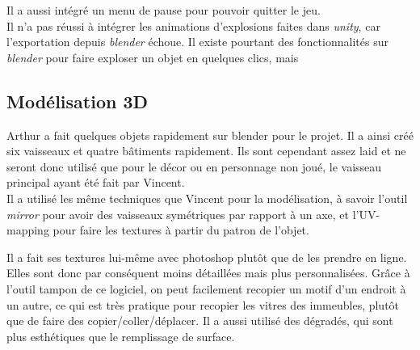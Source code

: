 \documentclass[10pt, titlepage]{report}
\begin{document}
Il a aussi intégré un menu de pause pour pouvoir quitter le jeu.\\

Il n'a pas réussi à intégrer les animations d'explosions faites dans \textit{unity}, car l'exportation depuis \textit{blender} échoue. Il existe pourtant des fonctionnalités sur \textit{blender} pour faire exploser un objet en quelques clics, mais

\subsection{Modélisation 3D}
Arthur a fait quelques objets rapidement sur blender pour le projet. Il a ainsi créé six vaisseaux et quatre bâtiments rapidement. Ils sont cependant assez laid et ne seront donc utilisé que pour le décor ou en personnage non joué, le vaisseau principal ayant été fait par Vincent.\\

Il a utilisé les même techniques que Vincent pour la modélisation, à savoir l'outil \textit{mirror} pour avoir des vaisseaux symétriques par rapport à un axe, et  l'UV-mapping pour faire les textures à partir du patron de l'objet.

Il a fait ses textures lui-même avec photoshop plutôt que de les prendre en ligne. Elles sont donc par conséquent moins détaillées mais plus personnalisées. Grâce à l'outil tampon de ce logiciel, on peut facilement recopier un motif d'un endroit à un autre, ce qui est très pratique pour recopier les vitres des immeubles, plutôt que de faire des copier/coller/déplacer. Il a aussi utilisé des dégradés, qui sont plus esthétiques que le remplissage de surface.\\ \\ \\
\end{document}
